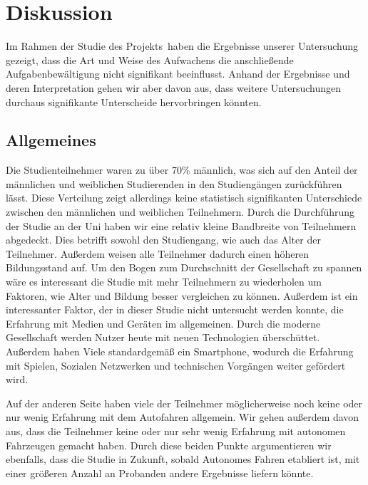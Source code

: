 \chapter{Diskussion}

Im Rahmen der Studie des Projekts \projectName \,haben die Ergebnisse unserer Untersuchung gezeigt, dass die Art und Weise des Aufwachens die anschließende Aufgabenbewältigung nicht signifikant beeinflusst.
Anhand der Ergebnisse und deren Interpretation gehen wir aber davon aus, dass weitere Untersuchungen durchaus signifikante Unterscheide hervorbringen könnten.

\section{Allgemeines}

Die Studienteilnehmer waren zu über 70\% männlich, was sich auf den Anteil der männlichen und weiblichen Studierenden in den Studiengängen zurückführen lässt. Diese Verteilung zeigt allerdings keine statistisch signifikanten Unterschiede zwischen den männlichen und weiblichen Teilnehmern.
Durch die Durchführung der Studie an der Uni haben wir eine relativ kleine Bandbreite von Teilnehmern abgedeckt. Dies betrifft sowohl den Studiengang, wie auch das Alter der Teilnehmer. Außerdem weisen alle Teilnehmer dadurch einen höheren Bildungsstand auf. 
Um den Bogen zum Durchschnitt der Gesellschaft zu spannen wäre es interessant die Studie mit mehr Teilnehmern zu wiederholen um Faktoren, wie Alter und Bildung besser vergleichen zu können.
Außerdem ist ein interessanter Faktor, der in dieser Studie nicht untersucht werden konnte, die Erfahrung mit Medien und Geräten im allgemeinen. 
Durch die moderne Gesellschaft werden Nutzer heute mit neuen Technologien überschüttet. Außerdem haben Viele standardgemäß ein Smartphone, wodurch die Erfahrung mit Spielen, Sozialen Netzwerken und technischen Vorgängen weiter gefördert wird.

Auf der anderen Seite haben viele der Teilnehmer möglicherweise noch keine oder nur wenig Erfahrung mit dem Autofahren allgemein. Wir gehen außerdem davon aus, dass die Teilnehmer keine oder nur sehr wenig Erfahrung mit autonomen Fahrzeugen gemacht haben. Durch diese beiden Punkte argumentieren wir ebenfalls, dass die Studie in Zukunft, sobald Autonomes Fahren etabliert ist, mit einer größeren Anzahl an Probanden andere Ergebnisse liefern könnte. 

